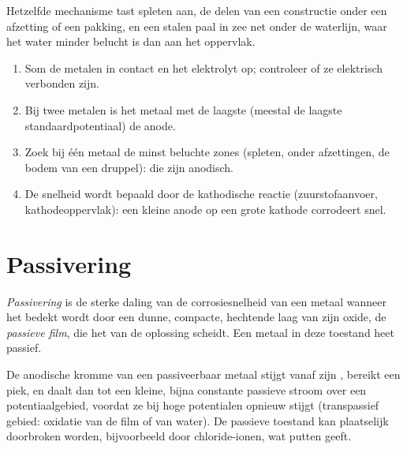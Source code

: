 Hetzelfde mechanisme tast spleten aan, de delen van een constructie onder een afzetting
of een pakking, en een stalen paal in zee net onder de waterlijn, waar
het water minder belucht is dan aan het oppervlak.

\begin{method}\label{met:b2:corrosion:diagnose}
\begin{enumerate}
  \item Som de metalen in contact en het elektrolyt op; controleer of ze
        elektrisch verbonden zijn.
  \item Bij twee metalen is het metaal met de laagste  (meestal de
        laagste standaardpotentiaal) de anode.
  \item Zoek bij één metaal de minst beluchte zones (spleten, onder afzettingen,
        de bodem van een druppel): die zijn anodisch.
  \item De snelheid wordt bepaald door de kathodische reactie (zuurstofaanvoer, kathodeoppervlak):
        een kleine anode op een grote kathode corrodeert snel.
\end{enumerate}
\end{method}

\section{Passivering}

\begin{definition}[Passivering]\label{def:b2:corrosion:passivation}
\emph{Passivering} is de sterke daling van de corrosiesnelheid
van een metaal wanneer het bedekt wordt door een dunne, compacte, hechtende laag van zijn
oxide, de \emph{passieve film}, die het van de
oplossing scheidt. Een metaal in deze toestand heet passief.
\end{definition}

\begin{proposition}\label{prop:b2:corrosion:passivity}
De anodische kromme van een passiveerbaar metaal stijgt vanaf zijn ,
bereikt een piek, en daalt dan tot een kleine, bijna constante passieve stroom over een
potentiaalgebied, voordat ze bij hoge potentialen opnieuw stijgt (transpassief
gebied: oxidatie van de film of van water). De passieve toestand kan plaatselijk
doorbroken worden, bijvoorbeeld door chloride-ionen, wat putten geeft.
\end{proposition}

